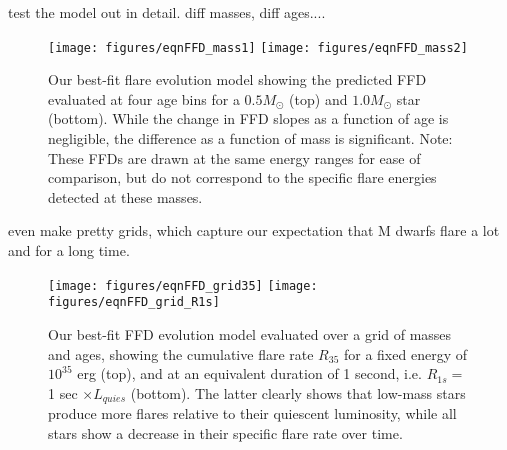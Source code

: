 \documentclass[preprint2]{aastex62}
\begin{document}
test the model out in detail. diff masses, diff ages....

\begin{figure}[!t]
\centering
\texttt{[image: figures/eqnFFD\_mass1]}
\texttt{[image: figures/eqnFFD\_mass2]}
\caption{
Our best-fit flare evolution model showing the predicted FFD evaluated at four age bins for a $0.5 M_\odot$ (top) and $1.0 M_\odot$ star (bottom). While the change in FFD slopes as a function of age is negligible, the difference as a function of mass is significant. Note: These FFDs are drawn at the same energy ranges for ease of comparison, but do not correspond to the specific flare energies detected at these masses.
}
\label{fig:model}
\end{figure}



even make pretty grids, which capture our expectation that M dwarfs flare a lot and for a long time.
\begin{figure}[!t]
\centering
\texttt{[image: figures/eqnFFD\_grid35]}
\texttt{[image: figures/eqnFFD\_grid\_R1s]}
\caption{
Our best-fit FFD evolution model evaluated over a grid of masses and ages, showing the cumulative flare rate $R_{35}$ for a fixed energy of $10^35$ erg (top), and at an equivalent duration of 1 second, i.e. $R_{1s} = $ 1 sec $\times L_{quies}$ (bottom). The latter clearly shows that low-mass stars produce more flares relative to their quiescent luminosity, while all stars show a decrease in their specific flare rate over time.
}
\label{fig:grid}
\end{figure}









%
%
%
%
\end{document}
